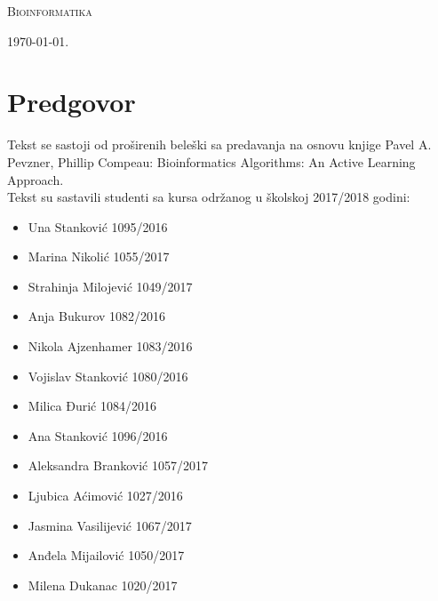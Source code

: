 \documentclass[a4paper]{book}
\begin{document}
\begin{titlepage}
	\vspace*{0.4\textheight}
	
	\begin{center}
		{\Huge \textsc{Bioinformatika}}
	\end{center}
	
	\vfill
	
	\begin{center}
		{\Large \today.}
	\end{center}
\end{titlepage}

\blankpage

\frontmatter
\tableofcontents
\blankpage

\chapter*{Predgovor}
Tekst se sastoji od proširenih beleški sa predavanja na osnovu knjige Pavel A. Pevzner, Phillip Compeau: Bioinformatics Algorithms: An Active Learning Approach. \\Tekst su sastavili studenti sa kursa održanog u školskoj 2017/2018 godini: 
\begin{itemize}
	\item Una Stanković 1095/2016
	\item Marina Nikolić 1055/2017
	\item Strahinja Milojević 1049/2017
	\item Anja Bukurov 1082/2016
	\item Nikola Ajzenhamer 1083/2016
	\item Vojislav Stanković 1080/2016
	\item Milica Đurić 1084/2016
	\item Ana Stanković 1096/2016
	\item Aleksandra Branković 1057/2017
	\item Ljubica Aćimović 1027/2016
	\item Jasmina Vasilijević 1067/2017
	\item Anđela Mijailović 1050/2017
	\item Milena Dukanac 1020/2017
\end{itemize}


\blankpage

\mainmatter







\backmatter
\renewcommand{\bibname}{Literatura}

\begingroup
\raggedright

\endgroup


\end{document}

